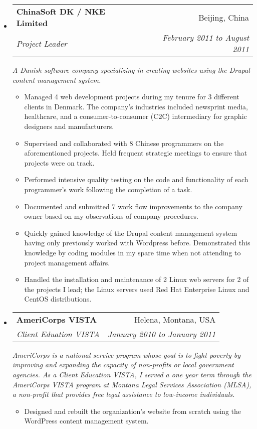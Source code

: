 \documentclass[a4paper,11pt]{article}
\makeatletter
\newcommand{\resitem}[1]{\item #1 \vspace{-2pt}}
\newcommand{\ressubheading}[4]{
\begin{tabular*}{6.5in}{l@{\cftdotfill{\cftsecdotsep}\extracolsep{\fill}}r}
        \textbf{#1} & #2 \\
        \textit{#3} & \textit{#4} \\
\end{tabular*}\vspace{-6pt}}
\makeatother
\begin{document}
\begin{itemize}
\item

    \ressubheading{ChinaSoft DK / NKE Limited}{Beijing, China}{Project Leader}{February 2011 to August 2011}
    \linebreak
    \linebreak
    \emph{A Danish software company specializing in creating websites using the Drupal content management system.}

    \begin{itemize}

            \resitem{Managed 4 web development projects during my tenure for 3 different clients in Denmark. The company’s industries included newsprint media, healthcare, and a consumer-to-consumer (C2C) intermediary for graphic designers and manufacturers.}

            \resitem{Supervised and collaborated with 8 Chinese programmers on the aforementioned projects. Held frequent strategic meetings to ensure that projects were on track.}

            \resitem{Performed intensive quality testing on the code and functionality of each programmer’s work following the completion of a task.}

            \resitem{Documented and submitted 7 work flow improvements to the company owner based on my observations of company procedures.}

            \resitem{Quickly gained knowledge of the Drupal content management system having only previously worked with Wordpress before. Demonstrated this knowledge by coding modules in my spare time when not attending to project management affairs.}

            \resitem{Handled the installation and maintenance of 2 Linux web servers for 2 of the projects I lead; the Linux servers used Red Hat Enterprise Linux and CentOS distributions.}

    \end{itemize}

\item

    \ressubheading{AmeriCorps VISTA}{Helena, Montana, USA}{Client Eduation VISTA}{January 2010 to January 2011}
    \linebreak
    \linebreak
    \emph{AmeriCorps is a national service program whose goal is to fight poverty by improving and expanding the capacity of non-profits or local government agencies. As a Client Education VISTA, I served a one year term through the AmeriCorps VISTA program at Montana Legal Services Association (MLSA), a non-profit that provides free legal assistance to low-income individuals.}
    \begin{itemize}
            \resitem{Designed and rebuilt the organization’s website from scratch using the WordPress content management system.}


\end{itemize}
\end{itemize}
\end{document}
